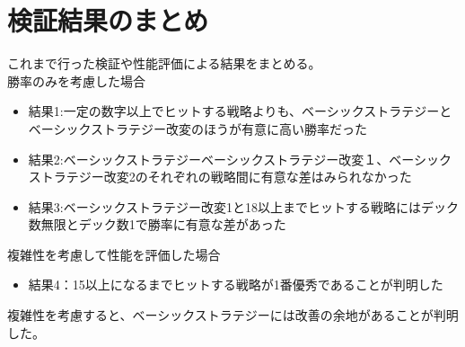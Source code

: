 \section{検証結果のまとめ}
これまで行った検証や性能評価による結果をまとめる。\\
勝率のみを考慮した場合
\begin{itemize}
\item 結果1:一定の数字以上でヒットする戦略よりも、ベーシックストラテジーとベーシックストラテジー改変のほうが有意に高い勝率だった
\item 結果2:ベーシックストラテジーベーシックストラテジー改変１、ベーシックストラテジー改変2のそれぞれの戦略間に有意な差はみられなかった
\item 結果3:ベーシックストラテジー改変1と18以上までヒットする戦略にはデック数無限とデック数1で勝率に有意な差があった
\end{itemize}
複雑性を考慮して性能を評価した場合
\begin{itemize}
\item 結果4：15以上になるまでヒットする戦略が1番優秀であることが判明した
\end{itemize}
複雑性を考慮すると、ベーシックストラテジーには改善の余地があることが判明した。